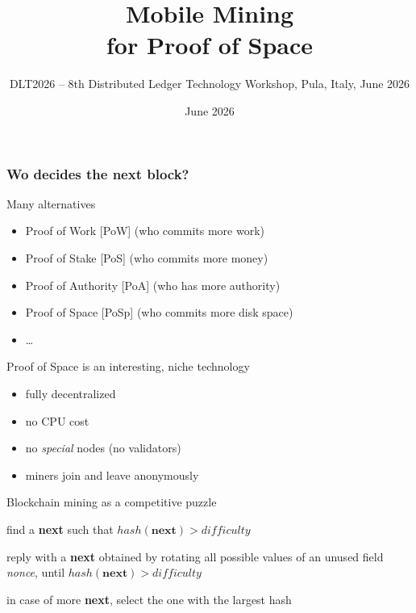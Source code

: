 \documentclass[11pt]{beamer}  %
\subtitle{DLT2026 – 8th Distributed Ledger Technology Workshop, Pula, Italy, June 2026}
\title{Mobile Mining\\for Proof of Space}
\institute{Universit\`a di Verona, Italy}
\date{June 2026}
\newcommand{\hash}{{\mathit{hash}}}
\newcommand{\difficulty}{{\mathit{difficulty}}}
\begin{document}
\begin{frame}
  \titlepage
\end{frame}

\begin{frame}
  \frametitle{Wo decides the next block?}

  \begin{greenbox}{Many alternatives}
    \begin{itemize}
    \item Proof of Work [PoW] (who commits more work)
    \item Proof of Stake [PoS] (who commits more money)
    \item Proof of Authority [PoA] (who has more authority)
    \item Proof of Space [PoSp] (who commits more disk space)
    \item \ldots
    \end{itemize}
  \end{greenbox}

  \bigskip
  
  \begin{greenbox}{Proof of Space is an interesting, niche technology}
  \begin{itemize}
  \item fully decentralized
  \item no CPU cost
  \item no \emph{special} nodes (no validators)
  \item miners join and leave anonymously
  \end{itemize}
  \end{greenbox}

\end{frame}

\begin{frame}{Blockchain mining as a competitive puzzle}

  \begin{description}
  \item<2->[{\color{red}challenge:}] find a \textbf{next} such that $\hash(\mathbf{next})>\difficulty$
  \item<3->[{\color{red}answer:}] reply with a \textbf{next} obtained
    by rotating all possible values of an unused field \emph{nonce}, until $\hash(\mathbf{next})>\difficulty$
  \item<4->[{\color{red}competition:}] in case of more \textbf{next}, select the one with the largest hash
  \end{description}

\end{frame}
\end{document}
